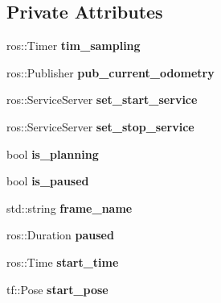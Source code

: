 \subsection*{Private Attributes}
\begin{DoxyCompactItemize}
\item 
ros\+::\+Timer {\bfseries tim\+\_\+sampling}\hypertarget{classPlanner_a8dd2352bf15aef91d49337d95dfe6b04}{}\label{classPlanner_a8dd2352bf15aef91d49337d95dfe6b04}

\item 
ros\+::\+Publisher {\bfseries pub\+\_\+current\+\_\+odometry}\hypertarget{classPlanner_a1eea64fbf5b532bedd2f5a20eaedb4d8}{}\label{classPlanner_a1eea64fbf5b532bedd2f5a20eaedb4d8}

\item 
ros\+::\+Service\+Server {\bfseries set\+\_\+start\+\_\+service}\hypertarget{classPlanner_ad3cb4222b988ec69a5b89e1c67b119cd}{}\label{classPlanner_ad3cb4222b988ec69a5b89e1c67b119cd}

\item 
ros\+::\+Service\+Server {\bfseries set\+\_\+stop\+\_\+service}\hypertarget{classPlanner_a9211a5e71956ef94e1306adcabb2e51d}{}\label{classPlanner_a9211a5e71956ef94e1306adcabb2e51d}

\item 
bool {\bfseries is\+\_\+planning}\hypertarget{classPlanner_afcb5f703c4d2a54bb8c8f8360864b763}{}\label{classPlanner_afcb5f703c4d2a54bb8c8f8360864b763}

\item 
bool {\bfseries is\+\_\+paused}\hypertarget{classPlanner_a247ba912994c9035473b9ee037aac307}{}\label{classPlanner_a247ba912994c9035473b9ee037aac307}

\item 
std\+::string {\bfseries frame\+\_\+name}\hypertarget{classPlanner_a1578a9b87a63d6a806ab46a863ec55cb}{}\label{classPlanner_a1578a9b87a63d6a806ab46a863ec55cb}

\item 
ros\+::\+Duration {\bfseries paused}\hypertarget{classPlanner_a0e99faac21bce026cb9b0b576b734c71}{}\label{classPlanner_a0e99faac21bce026cb9b0b576b734c71}

\item 
ros\+::\+Time {\bfseries start\+\_\+time}\hypertarget{classPlanner_ade39963b5d3f74b75feed62ab669979e}{}\label{classPlanner_ade39963b5d3f74b75feed62ab669979e}

\item 
tf\+::\+Pose {\bfseries start\+\_\+pose}\hypertarget{classPlanner_af8043c3dfe8d863cec156f6b5abddd76}{}\label{classPlanner_af8043c3dfe8d863cec156f6b5abddd76}


\end{DoxyCompactItemize}
